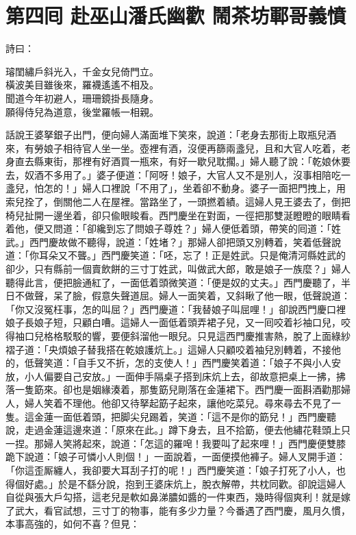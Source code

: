 
\chapter*{第四囘 赴巫山潘氏幽歡 鬧茶坊鄆哥義憤}


詩曰：

\begin{myquote} 
璿閨繡戶斜光入，千金女兒倚門立。\\橫波美目雖後來，羅襪遙遙不相及。\\聞道今年初避人，珊珊鏡掛長隨身。\\願得侍兒為道意，後堂羅帳一相親。
\end{myquote} 

話說王婆拏銀子出門，便向婦人滿面堆下笑來，說道：「老身去那街上取瓶兒酒來，有勞娘子相待官人坐一坐。壺裡有酒，沒便再篩兩盞兒，且和大官人吃着，老身直去縣東街，那裡有好酒買一瓶來，有好一歇兒耽擱。」{}婦人聽了說：「乾娘休要去，奴酒不多用了。」{}婆子便道：「阿呀！娘子，大官人又不是別人，{}沒事相陪吃一盞兒，怕怎的！」婦人口裡說「不用了」，坐着卻不動身。婆子一面把門拽上，用索兒拴了，倒關他二人在屋裡。當路坐了，一頭撚着績。這婦人見王婆去了，倒把椅兒扯開一邊坐着，{}卻只偸眼睃看。{}西門慶坐在對面，一徑把那雙涎瞪瞪的眼睛看着他，便又問道：「卻纔到忘了問娘子尊姓？」婦人便低着頭，帶笑的囘道：「姓武。」西門慶故做不聽得，說道：「姓堵？」那婦人卻把頭又別轉着，笑着低聲說道：「你耳朵又不聾。」西門慶笑道：「呸，忘了！正是姓武。只是俺清河縣姓武的卻少，只有縣前一個賣飲餅的三寸丁姓武，叫做武大郎，敢是娘子一族麼？」{}婦人聽得此言，便把臉通紅了，一面低着頭微笑道：「便是奴的丈夫。」西門慶聽了，半日不做聲，呆了臉，假意失聲道屈。婦人一面笑着，又斜瞅了他一眼，{}低聲說道：「你又沒冤枉事，怎的叫屈？」西門慶道：「我替娘子叫屈哩！」卻說西門慶口裡娘子長娘子短，只顧白嘈。這婦人一面低着頭弄裙子兒，又一囘咬着衫袖口兒，咬得袖口兒格格駁駁的響，要便斜溜他一眼兒。{}只見這西門慶推害熱，脫了上面綠紗褶子道：「央煩娘子替我搭在乾娘護炕上。」這婦人只顧咬着袖兒別轉着，不接他的，低聲笑道：「自手又不折，怎的支使人！」{}西門慶笑着道：「娘子不與小人安放，小人偏要自己安放。」一面伸手隔桌子搭到床炕上去，卻故意把桌上一拂，拂落一隻筯來。卻也是姻緣湊着，那隻筯兒剛落在金蓮裙下。西門慶一面斟酒勸那婦人，婦人笑着不理他。他卻又待拏起筯子起來，讓他吃菜兒。尋來尋去不見了一隻。這金蓮一面低着頭，把脚尖兒踢着，笑道：「這不是你的筯兒！」西門慶聽說，走過金蓮這邊來道：「原來在此。」蹲下身去，且不拾筯，便去他繡花鞋頭上只一捏。那婦人笑將起來，說道：「怎這的羅唣！我要叫了起來哩！」西門慶便雙膝跪下說道：「娘子可憐小人則個！」一面說着，一面便摸他褲子。婦人叉開手道：「你這歪厮纏人，我卻要大耳刮子打的呢！」西門慶笑道：「娘子打死了小人，也得個好處。」於是不繇分說，抱到王婆床炕上，脫衣解帶，共枕同歡。卻說這婦人自從與張大戶勾搭，這老兒是軟如鼻涕膿如醬的一件東西，幾時得個爽利！就是嫁了武大，看官試想，三寸丁的物事，能有多少力量？今番遇了西門慶，風月久慣，本事高強的，如何不喜？但見：

